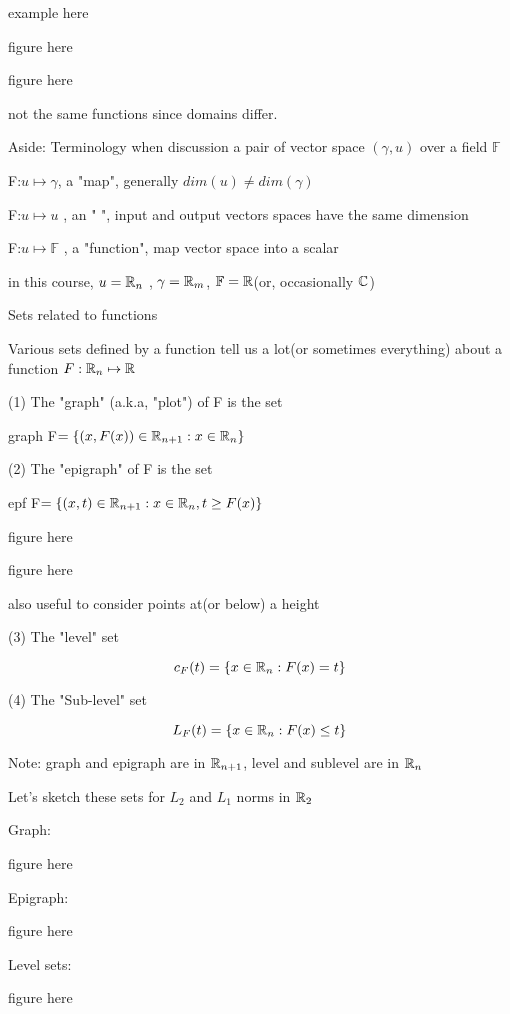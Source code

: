 example here

figure here

figure here



not the same functions since domains differ.



Aside: Terminology when discussion a pair of vector space $(\gamma,u)$ over a field $\mathbb{F}$

F:$u\mapsto \gamma$, a "map", generally $dim(u)\neq dim(\gamma)$

F:$u\mapsto u$ , an "   ", input and output vectors spaces have the same dimension

F:$u\mapsto \mathbb{F}$ , a "function", map vector space into a scalar

in this course, $u=\mathbb{R}_{n}$ , $\gamma=\mathbb{R}_{m}$, $\mathbb{F}=\mathbb{R}$(or, occasionally $\mathbb{C}$)



Sets related to functions

Various sets defined by a function tell us a lot(or sometimes everything) about a function $F:\mathbb{R}_{n}\mapsto\mathbb{R}$

(1) The "graph" (a.k.a, "plot") of F is the set

graph F$=\{(x,F(x))\in\mathbb{R}_{n+1}:x\in\mathbb{R}_{n}\}$

(2) The "epigraph" of F is the set 

epf F$=\{(x,t)\in\mathbb{R}_{n+1}:x\in\mathbb{R}_{n}, t\geq F(x) \}$

figure here

figure here


also useful to consider points at(or below) a height

(3) The "level" set

$$c_{F}(t)=\{x\in\mathbb{R}_{n}:F(x)=t\}$$

(4) The "Sub-level" set

$$L_{F}(t)=\{x\in\mathbb{R}_{n}:F(x)\leq t\}$$

Note: graph and epigraph are in $\mathbb{R}_{n+1}$, level and sublevel are in $\mathbb{R}_{n}$


Let's sketch these sets for $L_{2}$ and $L_{1}$ norms in $\mathbb{R}_{2}$

Graph:

figure here

Epigraph:

figure here

Level sets:

figure here

